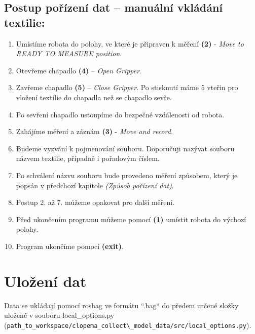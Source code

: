 \documentclass[10pt,a4paper,titlepage,oneside]{book}
\begin{document}
\subsection*{Postup pořízení dat – manuální vkládání textilie:}
\begin{enumerate}
  \item Umístíme robota do polohy, ve které je připraven k měření \textbf{(2)} - \textit{Move to READY TO MEASURE position}.
  \item Otevřeme chapadlo \textbf{(4)} – \textit{Open Gripper}.
  \item Zavřeme chapadlo \textbf{(5)} – \textit{Close Gripper}. Po stisknutí máme 5 vteřin pro vložení textilie do chapadla než se chapadlo sevře.
  \item Po sevření chapadlo ustoupíme do bezpečné vzdálenosti od robota.
  \item Zahájíme měření a záznám \textbf{(3)} - \textit{Move and record}.
  \item Budeme vyzvání k pojmenování souboru. Doporučuji nazývat souboru názvem textilie, případně i pořadovým číslem.
  \item Po schválení názvu souboru bude provedeno měření způsobem, který je popsán v předchozí kapitole \textit{(Způsob pořízení dat)}.
  \item Postup 2. až 7. můžeme opakovat pro další měření.
  \item Před ukončením programu můžeme pomocí \textbf{(1)} umístit robota do výchozí polohy.
  \item Program ukončíme pomocí \textbf{(exit)}.
\end{enumerate}

\section*{Uložení dat}
Data se ukládají pomocí rosbag ve formátu “.bag“ do předem určené složky uložené v souboru local\_options.py (\verb|path_to_workspace/clopema_collect\_model_data/src/local_options.py|).\\
\\
\end{document}
